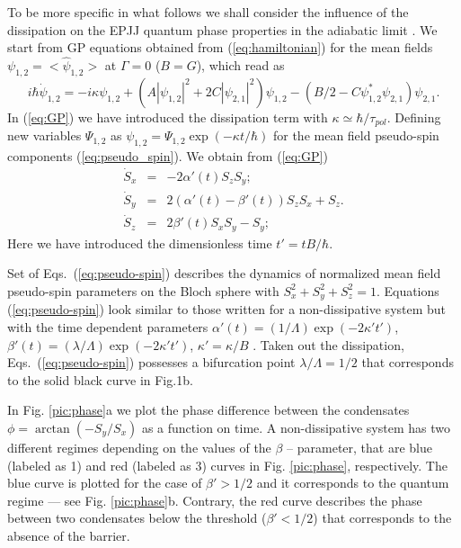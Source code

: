 \documentclass[aps, pre, preprint, groupedaddress, superscriptaddress, showkeys, showpacs] {revtex4-1}
\begin{document}
To be more specific in what follows we shall consider the influence of the dissipation on the EPJJ quantum phase properties in the adiabatic limit \cite{Sols}.
We start from GP equations obtained from  (\ref{eq:hamiltonian}) for the mean fields $\psi_{1,2}=<\hat\psi_{1,2}>$ at $\Gamma = 0$ ($B = G$), which read as
%
\begin{equation}
i \hbar \dot{\psi}_{1,2} = -i \kappa \psi_{1,2} + (A|\psi_{1,2}|^2 + 2C |\psi_{2,1}|^2) \psi_{1,2} - (B/2 - C \psi_{1,2}^* \psi_{2,1}) \psi_{2,1}. 
\label{eq:GP}
\end{equation}
%
In (\ref{eq:GP}) we have introduced the dissipation term with $\kappa \simeq \hbar/\tau_{pol}$.
Defining new variables $\Psi_{1,2}$ as $\psi_{1,2} = \Psi_{1,2} \exp(-\kappa t / \hbar)$ for the mean field pseudo-spin components (\ref{eq:pseudo_spin}).
We obtain from (\ref{eq:GP})
% 
\begin{equation}
\begin{array}{lcl}
\dot{S}_x & = & -2 \alpha'(t) S_z S_y; \\
\dot{S}_y & = & 2(\alpha'(t) - \beta'(t)) S_z S_x + S_z. \\
\dot{S}_z & = &  2 \beta'(t) S_x S_y - S_y;
\end{array}
\label{eq:pseudo-spin}
\end{equation}
%
Here we have introduced the dimensionless time $t' = t B / \hbar$.

Set of Eqs.\ ({\ref{eq:pseudo-spin}}) describes the dynamics of normalized mean field pseudo-spin parameters on the Bloch sphere with $S_x^2 + S_y^2 + S_z^2 = 1$.
Equations ({\ref{eq:pseudo-spin}}) look similar to those written for a non-dissipative system but with the time dependent parameters $\alpha'(t) = (1/ \Lambda) \exp(-2 \kappa' t')$, $\beta'(t) = (\lambda / \Lambda) \exp(-2 \kappa' t')$, $\kappa' = \kappa / B$ \cite{Sedov}.
Taken out the dissipation, Eqs.\ ({\ref{eq:pseudo-spin}}) possesses a bifurcation point $\lambda / \Lambda= 1 / 2$ that corresponds to the solid black curve in Fig.1b. 

In Fig. \ref{pic:phase}a we plot the phase difference between the condensates $ \phi = \arctan(-S_y / S_x)$ as a function on time.
A non-dissipative system has two different regimes depending on the values of the $\beta$ -- parameter, that are blue  (labeled as 1) and red (labeled as 3) curves in Fig. \ref{pic:phase}, respectively. The blue curve is plotted for the case of $\beta' > 1/2$ and it corresponds to the quantum regime --- see Fig. \ref{pic:phase}b. Contrary, the red curve describes the phase between two condensates below the threshold ($\beta' <1/2$) that corresponds to the absence of the barrier. 
\end{document}
